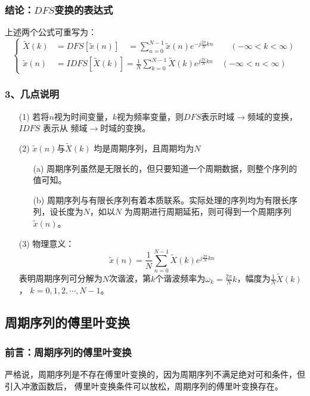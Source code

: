\documentclass[notheorems,compress,mathserif,table]{beamer}
\begin{document}
\begin{frame}[shrink]\frametitle{结论：$DFS$变换的表达式}%

上述两个公式可重写为：
\begin{equation*}
\left\{ \begin{aligned}
\tilde{X}(k) &= DFS[\tilde{x}(n)]\quad  = \sum_{n=0}^{N-1}\tilde{x}(n)e^{-j\frac{2\pi}{N}kn}  \qquad(-\infty<k<\infty)\\
\tilde{x}(n) &= IDFS[\tilde{X}(k)] =  \frac{1}{N}\sum_{k=0}^{N-1}\tilde{X}(k)e^{j\frac{2\pi}{N}kn}\quad(-\infty<n<\infty)
\end{aligned} \right.
\end{equation*}


\end{frame}







\begin{frame}[shrink]\frametitle{3、几点说明}%

\begin{enumerate}
\item [(1)] 若将$n$视为时间变量，$k$视为频率变量，则$DFS$表示时域$\rightarrow$频域的变换，$IDFS$ 表示从
频域$\rightarrow$时域的变换。
\item [(2)]
$\tilde{x}(n)$与$\tilde{X}(k)$ 均是周期序列，且周期均为$N$\par
\begin{enumerate}
\item  [(a)] 周期序列虽然是无限长的，但只要知道一个周期数据，则整个序列的值可知。
\item  [(b)] 周期序列与有限长序列有着本质联系。实际处理的序列均为有限长序列，设长度为$N$，如以$N$ 为周期进行周期延拓，则可得到一个周期序列$\tilde{x}(n)$。
\end{enumerate}
\item [(3)]  物理意义：
$$\tilde{x}(n) = \frac{1}{N}\sum_{n=0}^{N-1}\tilde{X}(k)e^{j\frac{2\pi}{N}kn}$$
表明周期序列可分解为$N$次谐波，第$k$个谐波频率为$\omega_{k}=\frac{2\pi}{N}k$，幅度为$\frac{1}{N}\tilde{X}(k)$，
$k=0,1,2,\cdots,N-1$。
\end{enumerate}
\end{frame}


\subsection*{周期序列的傅里叶变换}
\begin{frame}\frametitle{前言：周期序列的傅里叶变换}%


严格说，周期序列是不存在傅里叶变换的，因为周期序列不满足绝对可和条件，但引入冲激函数后，
傅里叶变换条件可以放松，周期序列的傅里叶变换存在。
\end{frame}
\end{document}
